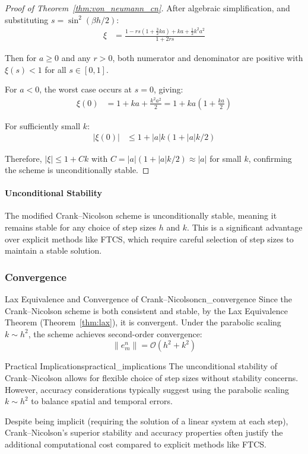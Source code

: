 \begin{proof}[Proof of Theorem~\ref{thm:von_neumann_cn}]
  After algebraic simplification, and substituting $s = \sin^2(\beta h/2)$:
  \begin{align*}
    \xi & = \frac{1 - rs(1 + \tfrac{3}{2}ka) + ka + \tfrac{1}{2}k^2a^2}{1 + 2rs}
  \end{align*}

  Then for $a \geq 0$ and any $r > 0$, both numerator and denominator are positive with $\xi(s) < 1$ for all $s \in [0,1]$.

  \medskip

  For $a < 0$, the worst case occurs at $s = 0$, giving:
  \begin{align*}
    \xi(0) & = 1 + ka + \frac{k^2a^2}{2} = 1 + ka\left(1 + \frac{ka}{2}\right)
  \end{align*}

  For sufficiently small $k$:
  \begin{align*}
    |\xi(0)| & \leq 1 + |a|k(1 + |a|k/2)
  \end{align*}

  Therefore, $|\xi| \leq 1 + Ck$ with $C = |a|(1 + |a|k/2) \approx |a|$ for small $k$, confirming the scheme is unconditionally stable.
\end{proof}

\paragraph{Unconditional Stability}
The modified Crank--Nicolson scheme is unconditionally stable, meaning it remains stable for any choice of step sizes $h$ and $k$.
This is a significant advantage over explicit methods like FTCS, which require careful selection of step sizes to maintain a stable solution.

\subsubsection{Convergence}
\begin{theorem}{Lax Equivalence and Convergence of Crank--Nicolson}{cn_convergence}
  Since the Crank--Nicolson scheme is both consistent and stable, by the Lax Equivalence Theorem (Theorem~\ref{thm:lax}), it is convergent. Under the parabolic scaling $k \sim h^2$, the scheme achieves second-order convergence:
  \[
    \|e_m^n\| = \mathcal{O}\left(h^2 + k^2\right)
  \]
\end{theorem}

\begin{remark}{Practical Implications}{practical_implications}
  The unconditional stability of Crank--Nicolson allows for flexible choice of step sizes without stability concerns. However, accuracy considerations typically suggest using the parabolic scaling $k \sim h^2$ to balance spatial and temporal errors.

  Despite being implicit (requiring the solution of a linear system at each step), Crank--Nicolson's superior stability and accuracy properties often justify the additional computational cost compared to explicit methods like FTCS.
\end{remark}

